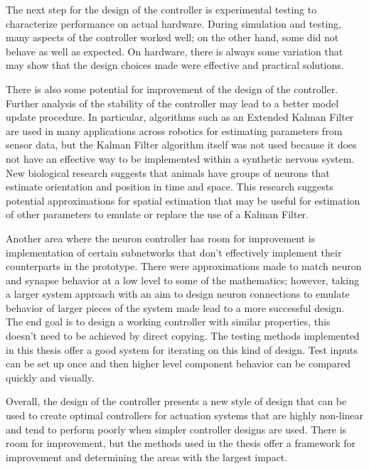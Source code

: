 The next step for the design of the controller is experimental testing to
characterize performance on actual hardware. During simulation and testing,
many aspects of the controller worked well; on the other hand, some did not
behave as well as expected. On hardware, there is always some variation that may
show that the design choices made were effective and practical solutions.

There is also some potential for improvement of the design of the controller.
Further analysis of the stability of the controller may lead to a better model
update procedure. In particular, algorithms such as an Extended Kalman Filter
are used in many applications across robotics for estimating parameters from
sensor data, but the Kalman Filter algorithm itself was not used because it does
not have an effective way to be implemented within a synthetic nervous system.
New biological research %
suggests that animals have groups of neurons that estimate orientation and
position in time and space. This research suggests potential approximations for
spatial estimation that may be useful for estimation of other parameters to
emulate or replace the use of a Kalman Filter.

Another area where the neuron controller has room for improvement is
implementation of certain subnetworks that don't effectively implement their
counterparts in the prototype. There were approximations made to match neuron
and synapse behavior at a low level to some of the mathematics; however, taking
a larger system approach with an aim to design neuron connections to emulate
behavior of larger pieces of the system made lead to a more successful design.
The end goal is to design a working controller with similar properties, this
doesn't need to be achieved by direct copying. The testing methods implemented
in this thesis offer a good system for iterating on this kind of design. Test
inputs can be set up once and then higher level component behavior can be
compared quickly and visually.

Overall, the design of the controller presents a new style of design that can be
used to create optimal controllers for actuation systems that are highly
non-linear and tend to perform poorly when simpler controller designs are used.
There is room for improvement, but the methods used in the thesis offer a
framework for improvement and determining the areas with the largest impact.
